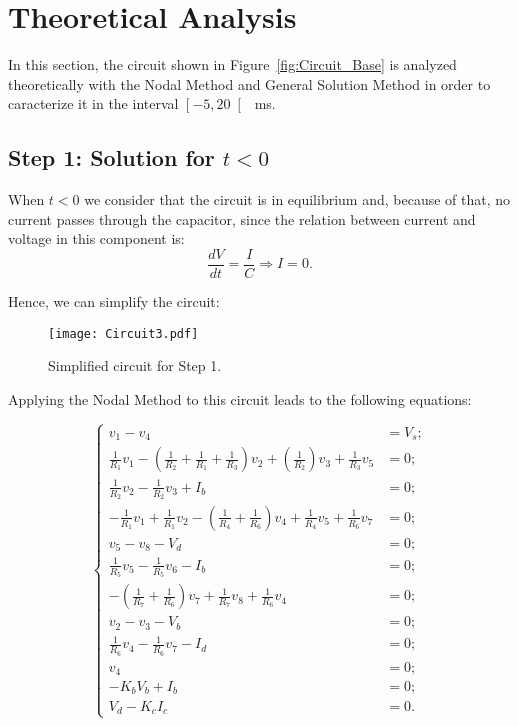 \section{Theoretical Analysis}
\label{sec:analysis}

In this section, the circuit shown in Figure~\ref{fig:Circuit_Base} is analyzed theoretically with the Nodal Method and General Solution Method in order to caracterize it in the interval $\left[-5,20\right[$~ms.

\subsection{Step 1: Solution for $t<0$}

When $t<0$ we consider that the circuit is in equilibrium and, because of that, no current passes through the capacitor, since the relation between current and voltage in this component is:
\begin{equation}
  \frac{dV}{dt}=\frac{I}{C} \Rightarrow I = 0.
  \label{eq:Cap}
\end{equation}

Hence, we can simplify the circuit:
\begin{figure}[h] \centering
\texttt{[image: Circuit3.pdf]}
\caption{Simplified circuit for Step 1.}
\label{fig:Circuit_Passo1}
\end{figure}

Applying the Nodal Method to this circuit leads to the following equations:

\begin{equation}
\begin{cases}
	v_1 - v_4 &= V_s;																				  \\
	\frac{1}{R_1}v_1 - (\frac{1}{R_2}+\frac{1}{R_1}+\frac{1}{R_3})v_2 + (\frac{1}{R_2})v_3 + \frac{1}{R_3}v_5 &= 0; 																						  \\
  	\frac{1}{R_2}v_2 - \frac{1}{R_2}v_3+ I_b &= 0;													  \\
  	-\frac{1}{R_1}v_1 + \frac{1}{R_1}v_2 - (\frac{1}{R_4}+\frac{1}{R_6})v_4 + \frac{1}{R_4}v_5 + \frac{1}{R_6}v_7 &= 0;			  																	  \\
	v_5 - v_8 - V_d &= 0;																			  \\
  	\frac{1}{R_5}v_5 - \frac{1}{R_5}v_6 - I_b &= 0;												  	  \\
  	-(\frac{1}{R_7}+\frac{1}{R_6})v_7 + \frac{1}{R_7}v_8 + \frac{1}{R_6}v_4 &= 0;					  \\
	v_2 - v_3 - V_b &= 0;																			  \\
  	\frac{1}{R_6}v_4 - \frac{1}{R_6}v_7 - I_d &= 0;													  \\
  	v_4 &= 0;																						  \\
  	-K_bV_b + I_b &= 0;																				  \\
  	V_d - K_cI_c &= 0.
\end{cases}
\end{equation}

